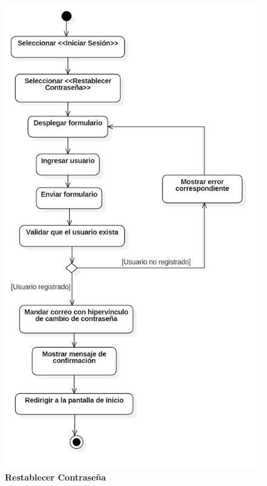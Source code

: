 \begin{figure}[H]
  \centering
    \includegraphics[scale=.5,angle=0]{project/Actividades/A_restablecer_contrasena.jpg}
  \caption{\textbf{Restablecer Contraseña}}
\end{figure}
